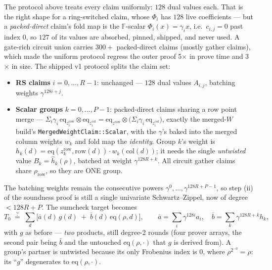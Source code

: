 \documentclass[11pt]{article}
\newcommand{\F}{\mathbb{F}}
\newcommand{\eq}{\mathrm{eq}}
\newcommand{\code}[1]{\texttt{#1}}
\begin{document}
The protocol above treats every claim uniformly: $128$ dual values each.
That is the right shape for a ring-switched claim, whose $\Phi_i$ has
$128$ live coefficients — but a \emph{packed-direct} claim's fold map is
the $\F$-scalar $\Phi_i(x) = \gamma_i x$, i.e.\ $c_{i,j} = 0$ past index
$0$, so $127$ of its values are absorbed, pinned, shipped, and never used.
A gate-rich circuit union carries $300+$ packed-direct claims (mostly
gather claims), which made the uniform protocol regress the outer proof
5$\times$ in prove time and 3$\times$ in size. The shipped v1 protocol
splits the claim set:

\begin{itemize}[nosep]
  \item \textbf{RS claims} $i = 0,\dots,R-1$: unchanged — $128$ dual
        values $A_{i,j}$, batching weights $\gamma^{128 i + j}$.
  \item \textbf{Scalar groups} $k = 0,\dots,P-1$: packed-direct claims
        sharing a row point merge — $\Sigma_i \gamma_i\,
        \eq_{z_i^{\mathrm{row}}}\!\otimes\eq_{z_i^{\mathrm{col}}} =
        \eq_{z^{\mathrm{row}}}\otimes\bigl(\Sigma_i \gamma_i\,
        \eq_{z_i^{\mathrm{col}}}\bigr)$, exactly the merged-$W$ build's
        \code{MergedWeightClaim::Scalar}, with the $\gamma$'s baked into
        the merged column weights $w_k$ and fold map the \emph{identity}.
        Group $k$'s weight is $h_k(d) = \eq(z_k^{\mathrm{row}},
        \mathrm{row}(d))\cdot w_k(\mathrm{col}(d))$; it needs the single
        \emph{untwisted} value $B_k = \hat h_k(\rho)$, batched at weight
        $\gamma^{128 R + k}$. All circuit gather claims share $\rho_{\mathrm{row}}$,
        so they are ONE group.
\end{itemize}

The batching weights remain the consecutive powers
$\gamma^0,\dots,\gamma^{128R + P - 1}$, so step (ii) of the soundness
proof is still a single univariate Schwartz--Zippel, now of degree
$< 128R + P$. The sumcheck target becomes
\[
  T_0 \;\stackrel{?}{=}\; \sum_{d} \bigl[\bar a(d)\,g(d) \;+\;
  \bar b(d)\,\eq(\rho,d)\bigr],
  \qquad
  \bar a = \sum_i \gamma^{128 i} a_i,\quad
  \bar b = \sum_k \gamma^{128R + k} h_k,
\]
with $g$ as before — \emph{two} products, still degree-2 rounds (four
prover arrays, the second pair being $\bar b$ and the untouched
$\eq(\rho,\cdot)$ that $g$ is derived from). A group's partner is
untwisted because its only Frobenius index is $0$, where
$\rho^{2^{-0}} = \rho$: its ``$g$'' degenerates to $\eq(\rho,\cdot)$.
\end{document}
